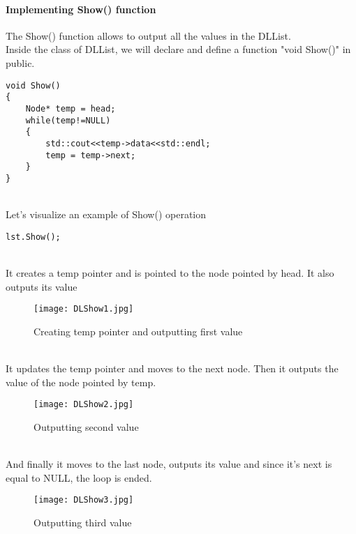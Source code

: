 \documentclass[11pt,fleqn]{book} %
\begin{document}
\paragraph{Implementing Show() function}
The Show()  function allows to output all the values in the DLList. \\
Inside the class of DLList, we will declare and define a function "void Show()" in public.
\begin{lstlisting}
void Show()
{
	Node* temp = head;
	while(temp!=NULL)
	{
		std::cout<<temp->data<<std::endl;
		temp = temp->next;
	}
}
\end{lstlisting}~\\
Let's visualize an example of Show() operation
\begin{example}
	\begin{lstlisting}
lst.Show();
	\end{lstlisting}~\\
It creates a temp pointer and is pointed to the node pointed by head. It also outputs its value
\begin{figure}[H]
	\centering
	\texttt{[image: DLShow1.jpg]}
	\caption{Creating temp pointer and outputting first value}
\end{figure} ~\\
It updates the temp pointer and moves to the next node. Then it outputs the value of the node pointed by temp.
\begin{figure}[H]
	\centering
	\texttt{[image: DLShow2.jpg]}
	\caption{Outputting second value}
\end{figure} ~\\
And finally it moves to the last node, outputs its value and since it's next is equal to NULL, the loop is ended.
\begin{figure}[H]
	\centering
	\texttt{[image: DLShow3.jpg]}
	\caption{Outputting third value}
\end{figure} ~\\
\end{example}
\end{document}
